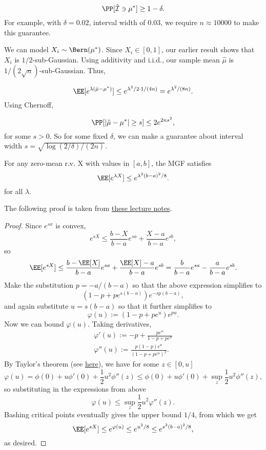 \[\PP[\hat{\mathcal{I}}\ni \mu^{*}] \geq 1-\delta.\] 
For example, with $\delta=0.02$, interval width of $0.03$, we require $n\approx 10000$ to make this guarantee.  

We can model $X_i\sim \Bern(\mu^*)$. Since $X_i\in [0,1]$, our earlier result shows that $X_i$ is $1/2$-sub-Gaussian. Using additivity and i.i.d., our sample mean $\hat{\mu}$ is $1/(2\sqrt{n})$-sub-Gaussian. Thus, 

\[\EE[e^{\lambda(\hat{\mu}-\mu^*)}] \leq e^{\lambda^2/2\cdot 1/(4n)} = e^{\lambda^2/(8n)}.\]
Using Chernoff,

\[\PP[\vert \hat{\mu}-\mu^*\vert \geq s] \leq 2e^{2ns^2},\] 
for some $s > 0$. So for some fixed $\delta$, we can make a guarantee about interval width $s = \sqrt{\log(2/\delta) / (2n)}$. 

\begin{theorem}

For any zero-mean r.v. X with values in $[a,b]$, the MGF satisfies 
\[\EE[e^{\lambda X}] \leq e^{\lambda^2 (b-a)^2 / 8}.\]
for all $\lambda$. 
\end{theorem}

The following proof is taken from \href{https://courses.cs.washington.edu/courses/cse521/21au/521-lecture-3.pdf}{these lecture notes}.

\begin{proof}
Since $e^{sx}$ is convex, 
\[e^{sX}\leq \frac{b-X}{b-a}e^{sa} + \frac{X-a}{b-a}e^{sb},\] 
so 
\[\EE[e^{sX}]\leq \frac{b-\EE[X]}{b-a}e^{sa} + \frac{\EE[X]-a}{b-a}e^{sb} = \frac{b}{b-a}e^{sa}-\frac{a}{b-a}e^{sb}.\] 
Make the substitution $p = -a/(b-a)$ so that the above expression simplifies to
\[(1-p+pe^{s(b-a)})e^{-sp(b-a)},\] 
and again substitute $u=s(b-a)$ so that it further simplifies to
\[\varphi(u) := (1-p+pe^u)e^{pu}.\]
Now we can bound $\varphi(u)$. Taking derivatives, 
\begin{align*}
	\varphi'(u) := -p+\frac{pe^u}{1-p+pe^u} \\
	\varphi''(u) := \frac{p(1-p)e^u}{(1-p+pe^u)^2}. 
\end{align*}
By Taylor's theorem (see \href{https://math.stackexchange.com/questions/3238111/application-of-taylors-theorem-find-upper-bound-for-remainder}{here}), we have for some $z\in [0,u]$
\[\varphi(u) = \phi(0) + u\phi'(0) + \frac{1}{2}u^2\phi''(z)\leq \phi(0) + u\phi'(0) + \sup_z \frac{1}{2}u^2\phi''(z),\]
so substituting in the expressions from above 
\[\varphi(u) \leq \sup_z \frac{1}{2}u^2 \varphi''(z).\] 
Bashing critical points eventually gives the upper bound $1/4$, from which we get 
\[\EE[e^{sX}]\leq e^{\varphi(u)} \leq e^{u^2/8} \leq e^{s^2(b-a)^2/8},\]
as desired.
\end{proof}

